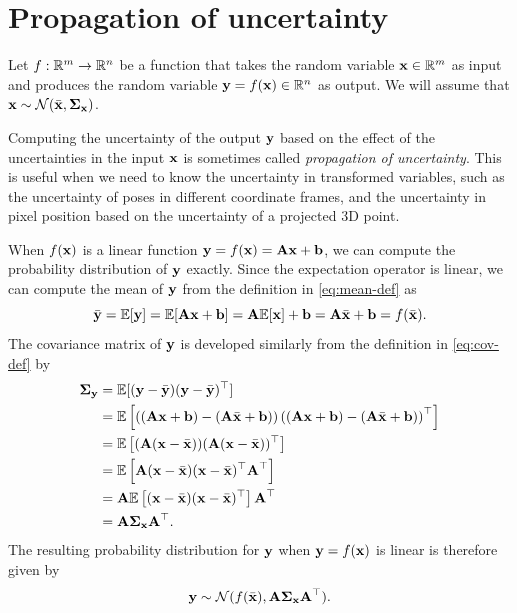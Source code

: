 \section{Propagation of uncertainty}
Let $f: \bbR^m \to \bbR^n$ be a function that takes the random variable $\vecx \in \bbR^m$ as input and produces the random variable $\vecy = f(\vecx) \in \bbR^n$ as output.
We will assume that $\vecx \sim \cN(\bar{\vecx}, \matSigma_\vecx)$.

Computing the uncertainty of the output $\vecy$ based on the effect of the uncertainties in the input $\vecx$ is sometimes called \emph{propagation of uncertainty}.
This is useful when we need to know the uncertainty in transformed variables, such as the uncertainty of poses in different coordinate frames, and the uncertainty in pixel position based on the uncertainty of a projected 3D point.

When $f(\vecx)$ is a linear function $\vecy = f(\vecx) = \matA\vecx + \vecb$, we can compute the probability distribution of $\vecy$ exactly.
Since the expectation operator is linear, we can compute the mean of $\vecy$ from the definition in \eqref{eq:mean-def} as
\begin{equation} \label{eq:linear-mean}
  \bar{\vecy} = \bbE[\vecy] = \bbE[\matA \vecx + \vecb] = \matA \bbE[\vecx] + \vecb = \matA \bar{\vecx} + \vecb = f(\bar{\vecx}).
\end{equation}
The covariance matrix of $\vecy$ is developed similarly from the definition in \eqref{eq:cov-def} by
\begin{subequations}\label{eq:linear-cov}
\begin{align}
  \matSigma_\vecy &= \bbE[(\vecy - \bar{\vecy}) (\vecy - \bar{\vecy})\trans]\\
  &= \bbE \left[  \left( (\matA \vecx + \vecb) - (\matA \bar{\vecx} + \vecb) \right) \left( (\matA \vecx + \vecb) - (\matA \bar{\vecx} + \vecb) \right)\trans \right]\\
  &= \bbE \left[ (\matA(\vecx - \bar{\vecx})) (\matA(\vecx - \bar{\vecx}))\trans \right]\\
  &= \bbE \left[ \matA(\vecx - \bar{\vecx}) (\vecx - \bar{\vecx})\trans \matA\trans \right]\\
  &= \matA \bbE\left[ (\vecx - \bar{\vecx}) (\vecx - \bar{\vecx})\trans \right] \matA\trans\\
  &= \matA \matSigma_\vecx \matA\trans.
\end{align}
\end{subequations}
The resulting probability distribution for $\vecy$ when $\vecy = f(\vecx)$ is linear is therefore given by
\begin{equation} \label{eq:linear-uncertainty-propagation}
  \vecy \sim \cN(f(\bar{\vecx}), \matA \matSigma_\vecx \matA\trans).
\end{equation}

